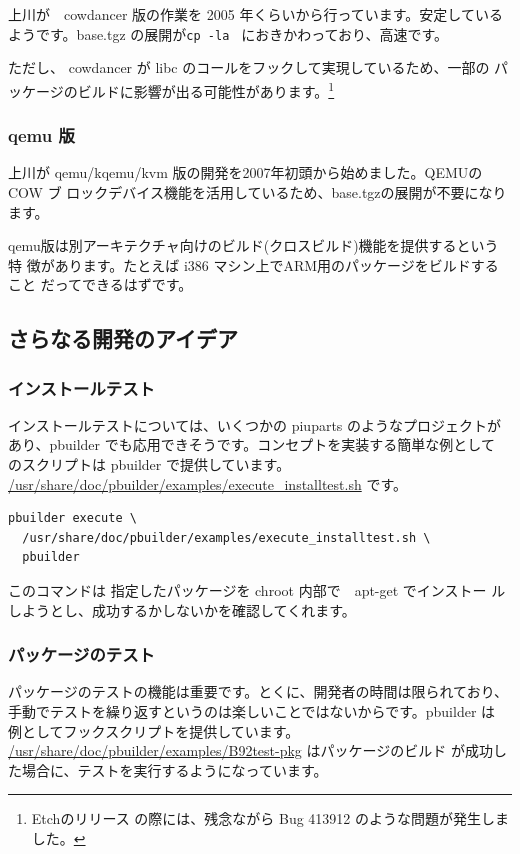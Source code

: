 \documentclass[mingoth,a4paper]{jsarticle}
\begin{document}
上川が　cowdancer 版の作業を 2005 年くらいから行っています。安定している
ようです。base.tgz の展開が\texttt{cp -la } におきかわっており、高速です。

ただし、 cowdancer が libc のコールをフックして実現しているため、一部の
パッケージのビルドに影響が出る可能性があります。\footnote{Etchのリリース
の際には、残念ながら Bug 413912 のような問題が発生しました。}

\subsubsection{qemu 版}

上川が qemu/kqemu/kvm 版の開発を2007年初頭から始めました。QEMUの COW ブ
ロックデバイス機能を活用しているため、base.tgzの展開が不要になります。

qemu版は別アーキテクチャ向けのビルド(クロスビルド)機能を提供するという特
徴があります。たとえば i386 マシン上でARM用のパッケージをビルドすること
だってできるはずです。

\subsection{さらなる開発のアイデア}

\subsubsection{インストールテスト}

インストールテストについては、いくつかの piuparts のようなプロジェクトが
あり、pbuilder でも応用できそうです。コンセプトを実装する簡単な例として
のスクリプトは pbuilder で提供しています。
\url{/usr/share/doc/pbuilder/examples/execute_installtest.sh} です。

\begin{verbatim}
pbuilder execute \
  /usr/share/doc/pbuilder/examples/execute_installtest.sh \
  pbuilder
\end{verbatim}

このコマンドは 指定したパッケージを chroot 内部で　apt-get でインストー
ルしようとし、成功するかしないかを確認してくれます。

\subsubsection{パッケージのテスト}

パッケージのテストの機能は重要です。とくに、開発者の時間は限られており、
手動でテストを繰り返すというのは楽しいことではないからです。pbuilder は
例としてフックスクリプトを提供しています。
\url{/usr/share/doc/pbuilder/examples/B92test-pkg} はパッケージのビルド
が成功した場合に、テストを実行するようになっています。
\end{document}
